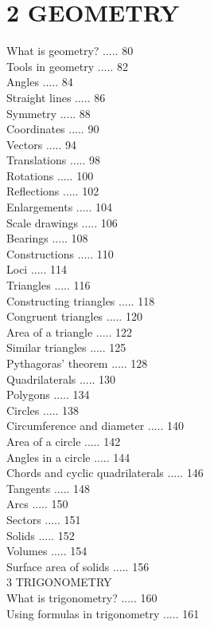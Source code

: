 \documentclass[10pt]{article}
\begin{document}
\section*{2 GEOMETRY}
What is geometry? ..... 80\\
Tools in geometry ..... 82\\
Angles ..... 84\\
Straight lines ..... 86\\
Symmetry ..... 88\\
Coordinates ..... 90\\
Vectors ..... 94\\
Translations ..... 98\\
Rotations ..... 100\\
Reflections ..... 102\\
Enlargements ..... 104\\
Scale drawings ..... 106\\
Bearings ..... 108\\
Constructions ..... 110\\
Loci ..... 114\\
Triangles ..... 116\\
Constructing triangles ..... 118\\
Congruent triangles ..... 120\\
Area of a triangle ..... 122\\
Similar triangles ..... 125\\
Pythagoras' theorem ..... 128\\
Quadrilaterals ..... 130\\
Polygons ..... 134\\
Circles ..... 138\\
Circumference and diameter ..... 140\\
Area of a circle ..... 142\\
Angles in a circle ..... 144\\
Chords and cyclic quadrilaterals ..... 146\\
Tangents ..... 148\\
Arcs ..... 150\\
Sectors ..... 151\\
Solids ..... 152\\
Volumes ..... 154\\
Surface area of solids ..... 156\\
3 TRIGONOMETRY\\
What is trigonometry? ..... 160\\
Using formulas in trigonometry ..... 161\\
\end{document}

